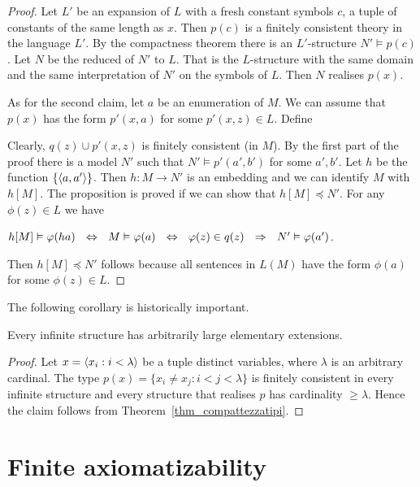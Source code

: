 \documentclass[creche.tex]{subfiles}
\begin{document}
\begin{proof}
 
Let $L'$ be an expansion of $L$ with a fresh constant symbols $c$, a tuple of constants of the same length as $x$. Then $p(c)$ is a finitely consistent theory in the language $L'$. By the compactness theorem there is an $L'$-structure $N'\models p(c)$. Let $N$ be the reduced of $N'$ to $L$. That is the $L$-structure with the same domain and the same interpretation of $N'$ on the symbols of $L$. Then $N$ realises $p(x)$.  

As for the second claim, let $a$ be an enumeration of $M$. We can assume that $p(x)$ has the form $p'(x,a)$ for some $p'(x,z)\in L$. Define


Clearly, $q(z)\cup p'(x,z)$ is finitely consistent (in $M$). By the first part of the proof there is a model $N'$ such that $N'\models p'(a',b')$ for some $a',b'$. Let $h$ be the function $\{\langle a,a'\rangle\}$. Then $h:M\to N'$ is an embedding and we can identify $M$ with $h[M]$. The proposition is proved if we can show that $h[M]\preceq N'$. For any $\phi(z)\in L$ we have


\hfil $h[M]\vDash\varphi(ha)\ \ \Leftrightarrow\ \  M\vDash \varphi(a)\ \  \Leftrightarrow\ \  \varphi(z)\in q(z)\ \   \Rightarrow\ \  N'\vDash \varphi(a')$.

Then $h[M]\preceq N'$ follows because all sentences in $L(M)$ have the form $\phi(a)$ for some $\phi(z)\in L$.
\end{proof}

The following corollary is historically important.

\begin{void_thm}
Every infinite structure has arbitrarily large elementary extensions.
\end{void_thm}

\begin{proof}
Let $x=\langle x_i:i<\lambda\rangle$ be a tuple distinct variables, where $\lambda$ is an arbitrary cardinal. The type $p(x)=\big\{x_i\neq x_j: i<j<\lambda\big\}$ is finitely consistent in every infinite structure and every structure that realises $p$ has cardinality $\ge\lambda$. Hence the claim follows from Theorem~\ref{thm_compattezzatipi}.
\end{proof}




\section{Finite axiomatizability}
\end{document}
